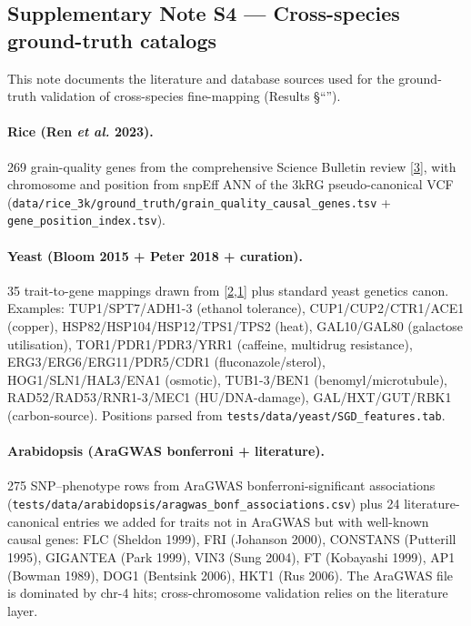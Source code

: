 \clearpage

\subsection*{Supplementary Note S4 --- Cross-species ground-truth catalogs}\label{snote:multispecies_gt}

This note documents the literature and database sources used for the
ground-truth validation of cross-species fine-mapping (Results
\S``'').

\paragraph{Rice (Ren \emph{et al.} 2023).}
269 grain-quality genes from the comprehensive Science Bulletin
review [\hyperref[snote_S4_ref3]{3}], with chromosome and position from snpEff
ANN of the 3kRG pseudo-canonical VCF
(\texttt{data/rice\_3k/ground\_truth/grain\_quality\_causal\_genes.tsv}
+ \texttt{gene\_position\_index.tsv}).

\paragraph{Yeast (Bloom 2015 + Peter 2018 + curation).}
35 trait-to-gene mappings drawn from [\hyperref[snote_S4_ref2]{2},\hyperref[snote_S4_ref1]{1}]
plus standard yeast genetics canon. Examples:
TUP1/SPT7/ADH1-3 (ethanol tolerance), CUP1/CUP2/CTR1/ACE1 (copper),
HSP82/HSP104/HSP12/TPS1/TPS2 (heat), GAL10/GAL80
(galactose utilisation), TOR1/PDR1/PDR3/YRR1 (caffeine, multidrug
resistance), ERG3/ERG6/ERG11/PDR5/CDR1 (fluconazole/sterol),
HOG1/SLN1/HAL3/ENA1 (osmotic), TUB1-3/BEN1 (benomyl/microtubule),
RAD52/RAD53/RNR1-3/MEC1 (HU/DNA-damage), GAL/HXT/GUT/RBK1
(carbon-source). Positions parsed from
\texttt{tests/data/yeast/SGD\_features.tab}.

\paragraph{Arabidopsis (AraGWAS bonferroni + literature).}
275 SNP--phenotype rows from AraGWAS bonferroni-significant
associations (\texttt{tests/data/arabidopsis/aragwas\_bonf\_associations.csv})
plus 24 literature-canonical entries we added for traits not in
AraGWAS but with well-known causal genes:
FLC (Sheldon 1999), FRI (Johanson 2000), CONSTANS (Putterill 1995),
GIGANTEA (Park 1999), VIN3 (Sung 2004), FT (Kobayashi 1999), AP1
(Bowman 1989), DOG1 (Bentsink 2006), HKT1 (Rus 2006). The AraGWAS file is dominated by chr-4 hits; cross-chromosome
validation relies on the literature layer.

